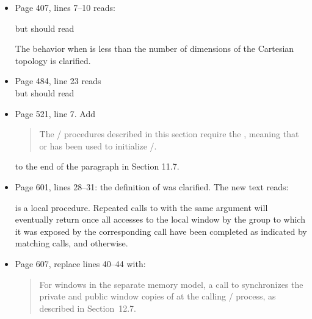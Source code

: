 \begin{itemize}
\item Page 407, lines 7--10 reads:\\

but should read\\

The behavior when  is less than the number of dimensions of the
Cartesian topology is clarified.


\item Page 484, line 23 reads\\
but should read\\

\item Page 521, line 7. Add
\begin{quote}
The \mpi/ procedures described in this section require the \wpm{}, meaning that  or   has been used to initialize \mpi/.
\end{quote}
to the end of the paragraph in Section 11.7.

\item Page 601, lines 28--31: the definition of  was clarified.
The new text reads:

 is a local procedure.
Repeated calls to  with the same  argument
will eventually return  once all accesses to the
local window by the group to which it was exposed by the corresponding
 call have been completed as indicated by matching
 calls, and  otherwise.


\item Page 607, replace lines 40--44 with:
\begin{quote}
For windows in the separate memory model,
a call to  synchronizes the private and public window
copies of  at the calling \MPI/ process, as described in
Section~12.7.


\end{quote}
\end{itemize}
